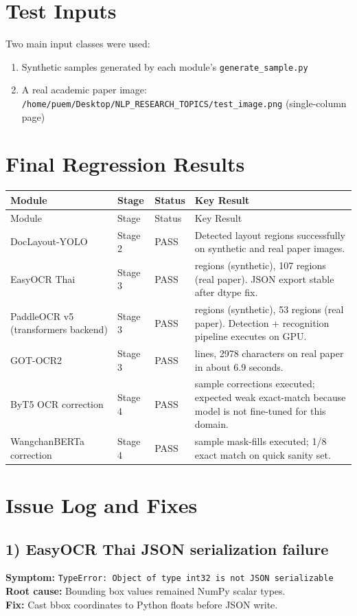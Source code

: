 \documentclass[11pt,a4paper]{article}
\begin{document}
\section{Test Inputs}
Two main input classes were used:
\begin{enumerate}
  \item Synthetic samples generated by each module's \texttt{generate\_sample.py}
  \item A real academic paper image: \texttt{/home/puem/Desktop/NLP\_RESEARCH\_TOPICS/test\_image.png} (single-column page)
\end{enumerate}

\section{Final Regression Results}
\begin{longtable}{>{\raggedright\arraybackslash}p{2.8cm} >{\raggedright\arraybackslash}p{2.2cm} >{\raggedright\arraybackslash}p{2.2cm} >{\raggedright\arraybackslash}p{6.2cm}}
\toprule
Module & Stage & Status & Key Result \\
\midrule
\endfirsthead
\toprule
Module & Stage & Status & Key Result \\
\midrule
\endhead
DocLayout-YOLO & Stage 2 & PASS & Detected layout regions successfully on synthetic and real paper images. \\
EasyOCR Thai & Stage 3 & PASS & 42 regions (synthetic), 107 regions (real paper). JSON export stable after dtype fix. \\
PaddleOCR v5 (transformers backend) & Stage 3 & PASS & 8 regions (synthetic), 53 regions (real paper). Detection + recognition pipeline executes on GPU. \\
GOT-OCR2 & Stage 3 & PASS & 53 lines, 2978 characters on real paper in about 6.9 seconds. \\
ByT5 OCR correction & Stage 4 & PASS & 8 sample corrections executed; expected weak exact-match because model is not fine-tuned for this domain. \\
WangchanBERTa correction & Stage 4 & PASS & 8 sample mask-fills executed; 1/8 exact match on quick sanity set. \\
\bottomrule
\end{longtable}

\section{Issue Log and Fixes}
\subsection*{1) EasyOCR Thai JSON serialization failure}
\textbf{Symptom:} \texttt{TypeError: Object of type int32 is not JSON serializable} \\
\textbf{Root cause:} Bounding box values remained NumPy scalar types. \\
\textbf{Fix:} Cast bbox coordinates to Python floats before JSON write.
\end{document}
